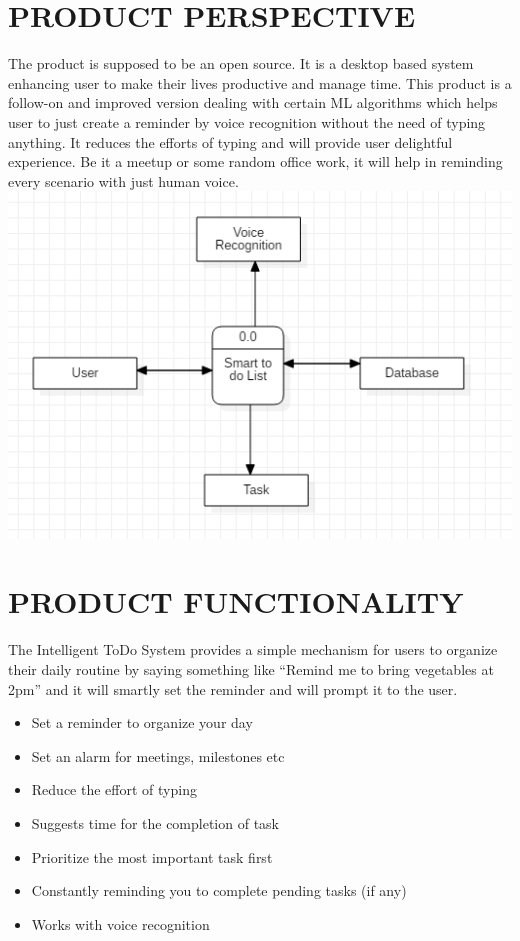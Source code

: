 \documentclass[12pt, a4paper]{report}
\begin{document}
\section{PRODUCT PERSPECTIVE }
The product is supposed to be an open source. It is a desktop based system enhancing user to make their lives productive and manage time. This product is a follow-on and improved version dealing with certain ML algorithms which helps user to just create a reminder by voice recognition without the need of typing anything. It reduces the efforts of typing and will provide user delightful experience. Be it a meetup or some random office work, it will help in reminding every scenario with just human voice. \newline \newline \includegraphics[scale=1.2]{dfd.png}
\newpage
\section{PRODUCT FUNCTIONALITY }
The Intelligent ToDo System provides a simple mechanism for users to organize their daily routine by saying something like “Remind me to bring vegetables at 2pm” and it will smartly set the reminder and will prompt it to the user. 
\begin{itemize}
	\item Set a reminder to organize your day
	\item Set an alarm for meetings, milestones etc
	\item Reduce the effort of typing 
	\item Suggests time for the completion of task 
	\item Prioritize the most important task first
	\item Constantly reminding you to complete pending tasks (if any)
	\item Works with voice recognition
\end{itemize}
\end{document}
